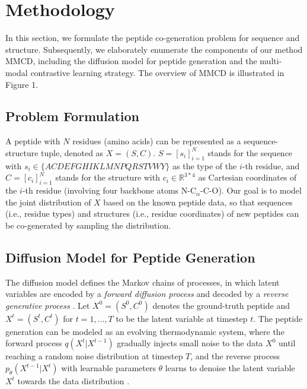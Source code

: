 \documentclass[letterpaper]{article} %
\begin{document}
\section{Methodology}
In this section, we formulate the peptide co-generation problem for sequence and structure. Subsequently, we elaborately enumerate the components of our method MMCD, including the diffusion model for peptide generation and the multi-modal contrastive learning strategy. The overview of MMCD is illustrated in Figure 1.

\subsection{Problem Formulation}
A peptide with $N$ residues (amino acids) can be represented as a sequence-structure tuple, denoted as $X=(S,C)$. $S=[s_i]_{i=1}^{N}$ stands for the sequence with $s_i\in \{ACDEFGHIKLMNPQRSTVWY\}$ as the type of the $i$-th residue, and $C=[c_i]_{i=1}^{N}$ stands for the structure with $c_i \in \mathbb{R}^{3\ast4}$ as Cartesian coordinates of the $i$-th residue (involving four backbone atoms N-C$_\alpha$-C-O). Our goal is to model the joint distribution of $X$ based on the known peptide data, so that sequences (i.e., residue types) and structures (i.e., residue coordinates) of new peptides can be co-generated by sampling the distribution.

\subsection{Diffusion Model for Peptide Generation}
The diffusion model defines the Markov chains of processes, in which latent variables are encoded by a \emph{forward diffusion process} and decoded by a \emph{reverse generative process} \cite{sohl-dicksteinDeepUnsupervised2015}. Let $X^0=(S^0,C^0)$ denotes the ground-truth peptide and $X^t=(S^t,C^t)$ for $t=1,...,T$ to be the latent variable at timestep $t$. The peptide generation can be modeled as an evolving thermodynamic system, where the forward process $q(X^t|X^{t-1})$ gradually injects small noise to the data $X^0$ until reaching a random noise distribution at timestep $T$, and the reverse process $p_\theta(X^{t-1}|X^t)$ with learnable parameters $\theta$ learns to denoise the latent variable $X^t$ towards the data distribution \cite{luoAntigenSpecificAntibody2022}.
\end{document}
